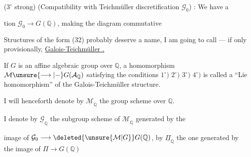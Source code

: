 ($3^{\circ}$ strong) (Compatibility with Teichmüller discretification $\mathcal{G}_0$) : We have a 


tion $\mathcal{G}_0\longrightarrow G(\mathbb{Q})$, making  the diagram commutative

Structures of the form (32) probably deserve a name, I am going to call  --- if only provisionally, \uline{Galois-Teichmüller .}

If $G$ is an affine algebraic group over $\mathbb{Q}$, a homomorphism $\mathcal{M}\unsure{\longrightarrow|{-}}G(\mathcal{A}_{\mathbb{Q}})$ satisfying the conditions $1^{\circ})$ $2^{\circ})$ $3^{\circ})$  $4^{\circ})$ is called a ``Lie homomorphism'' of the Galois-Teichmüller structure.

I will henceforth denote by $\underline{\mathcal{M}}_{\mathbb{Q}}$  the group scheme  over $\mathbb{Q}$. 

I denote by  $\underline{\mathcal{G}}_{\mathbb{Q}}$ the subgroup scheme of $\underline{\mathcal{M}}_{\mathbb{Q}}$ generated by the


image of $\mathcal{G}_0\longrightarrow\deleted{\unsure{\mathcal{M}|G}}G(\mathbb{Q})$, by $\underline{\Pi}_{\mathbb{Q}}$ the one generated by the image of $\Pi\longrightarrow G(\mathbb{Q})$

